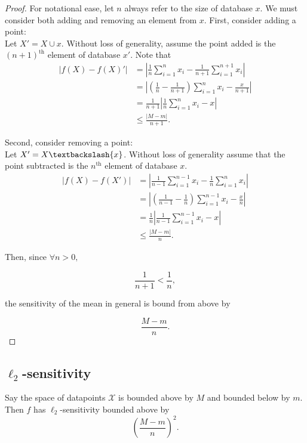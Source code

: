 \documentclass[11pt]{scrartcl} %
\begin{document}
\begin{proof}
For notational ease, let $n$ always refer to the size of database $x$. We must consider both adding and removing an element from $x$. First, consider adding a point:\\

Let $X' = X \cup {x}$. Without loss of generality, assume the point added is the $(n+1)^{\text{th}}$ element of database $x'$. Note that
\begin{align*}
\left \vert f(X) - f(X)' \right\vert &= \left\vert \frac{1}{n} \sum_{i=1}^n x_i - \frac{1}{n+1} \sum_{i=1}^{n+1} x_i \right\vert \\
	&= \left\vert \left(\frac{1}{n} - \frac{1}{n+1}\right) \sum_{i=1}^n x_i - \frac{x}{n+1}\right\vert \\
	&= \frac{1}{n+1} \left\vert \frac{1}{n} \sum_{i=1}^n x_i - x \right\vert \\
	&\le \frac{ \left\vert M - m \right\vert}{n+1}.
\end{align*}

Second, consider removing a point: \\
Let $X' = X\textbackslash\{x\}$. Without loss of generality assume that the point subtracted is the $n^{\text{th}}$ element of database $x$.
\begin{align*}
\left \vert f(X) - f(X') \right\vert &= \left\vert \frac{1}{n-1} \sum_{i=1}^{n-1} x_i - \frac{1}{n} \sum_{i=1}^n x_i \right\vert \\
	&= \left\vert \left(\frac{1}{n-1} - \frac{1}{n}\right) \sum_{i=1}^{n-1} x_i - \frac{x}{n}\right\vert \\
	&= \frac{1}{n} \left\vert \frac{1}{n-1} \sum_{i=1}^{n-1} x_i  - x \right\vert \\
	&\le \frac{\left\vert M-m\right\vert}{n}.
\end{align*}

Then, since $\forall n > 0,$

$$ \frac{1}{n+1} < \frac{1}{n},$$

the sensitivity of the mean in general is bound from above by 

$$ \frac{M-m}{n}.$$
\end{proof}

\subsection{$\ell_2$-sensitivity}

\begin{theorem}
Say the space of datapoints $\mathcal{X}$ is bounded above by $M$ and bounded below by $m$. Then $f$ has $\ell_2$-sensitivity bounded above by
	$$ \left( \frac{M-m}{n} \right)^2. $$
\end{theorem}
\end{document}
